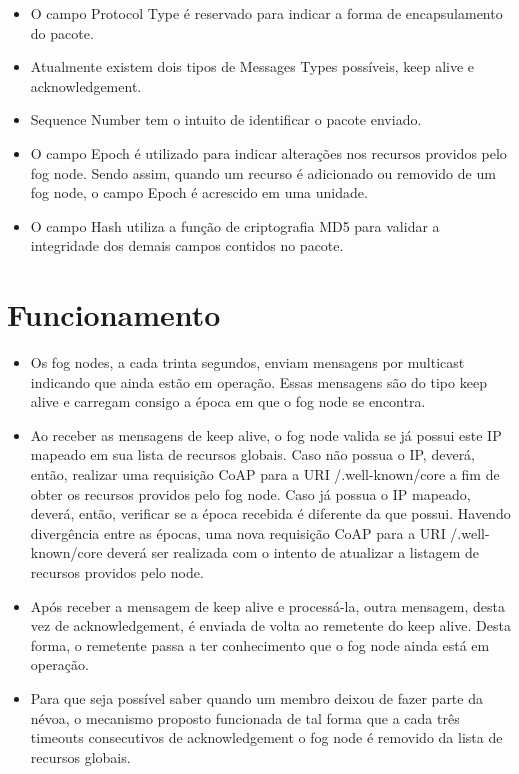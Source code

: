 \documentclass[a0,portrait]{lab-poster}
\begin{document}
\begin{multicols}{2}
\begin{itemize}
\item O campo Protocol Type é reservado para indicar a forma de encapsulamento do pacote.
\item Atualmente existem dois tipos de Messages Types possíveis, keep alive e acknowledgement.
\item Sequence Number tem o intuito de identificar o pacote enviado.
\item O campo Epoch é utilizado para indicar alterações nos recursos providos pelo fog node.
Sendo assim, quando um recurso é adicionado ou removido de um fog node, o campo Epoch é acrescido em uma unidade.
\item O campo Hash utiliza a função de criptografia MD5 para validar a integridade dos demais campos contidos no pacote.
\end{itemize}



\section*{\huge Funcionamento}

\Large
\justifying
\begin{itemize}

\item Os fog nodes, a cada trinta segundos, enviam mensagens por multicast indicando que ainda estão em operação.
Essas mensagens são do tipo keep alive e carregam consigo a época em que o fog node se encontra. 
\item Ao receber as mensagens de keep alive, o fog node valida se já possui este IP mapeado em sua lista de recursos globais.
Caso não possua o IP, deverá, então, realizar uma requisição CoAP para a URI /.well-known/core a fim de obter os recursos providos pelo fog node.
Caso já possua o IP mapeado, deverá, então, verificar se a época recebida é diferente da que possui.
Havendo divergência entre as épocas, uma nova requisição CoAP para a URI /.well-known/core deverá ser realizada com o intento de atualizar a listagem de recursos providos pelo node.
\item Após receber a mensagem de keep alive e processá-la, outra mensagem, desta vez de acknowledgement, é enviada de volta ao remetente do keep alive.
Desta forma, o remetente passa a ter conhecimento que o fog node ainda está em operação.
\item Para que seja possível saber quando um membro deixou de fazer parte da névoa, o mecanismo proposto funcionada de tal forma que a cada três timeouts consecutivos de acknowledgement
o fog node é removido da lista de recursos globais.


\end{itemize}
\end{multicols}
\end{document}
